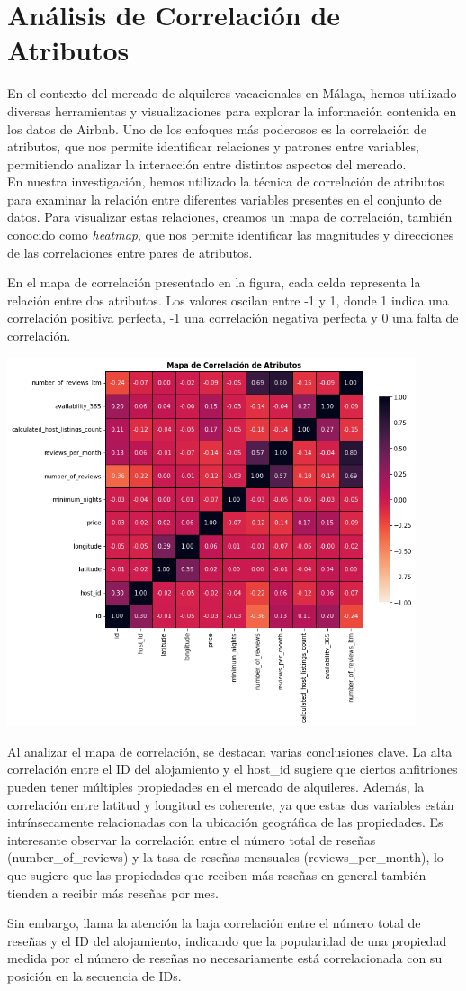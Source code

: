 \section{Análisis de Correlación de Atributos}
En el contexto del mercado de alquileres vacacionales en Málaga, hemos utilizado diversas herramientas y visualizaciones para explorar la información contenida en los datos de Airbnb. Uno de los enfoques más poderosos es la correlación de atributos, que nos permite identificar relaciones y patrones entre variables, permitiendo analizar la interacción entre distintos aspectos del mercado.\\
En nuestra investigación, hemos utilizado la técnica de correlación de atributos para examinar la relación entre diferentes variables presentes en el conjunto de datos. Para visualizar estas relaciones, creamos un mapa de correlación, también conocido como \textit{heatmap}, que nos permite identificar las magnitudes y direcciones de las correlaciones entre pares de atributos.

En el mapa de correlación presentado en la figura, cada celda representa la relación entre dos atributos. Los valores oscilan entre -1 y 1, donde 1 indica una correlación positiva perfecta, -1 una correlación negativa perfecta y 0 una falta de correlación.
\begin{center}
    \centering
    \includegraphics[width=0.9\textwidth]{capturas/25.png}
\end{center}
Al analizar el mapa de correlación, se destacan varias conclusiones clave. La alta correlación entre el ID del alojamiento y el host\_id sugiere que ciertos anfitriones pueden tener múltiples propiedades en el mercado de alquileres. Además, la correlación entre latitud y longitud es coherente, ya que estas dos variables están intrínsecamente relacionadas con la ubicación geográfica de las propiedades.
Es interesante observar la correlación entre el número total de reseñas (number\_of\_reviews) y la tasa de reseñas mensuales (reviews\_per\_month), lo que sugiere que las propiedades que reciben más reseñas en general también tienden a recibir más reseñas por mes. 

Sin embargo, llama la atención la baja correlación entre el número total de reseñas y el ID del alojamiento, indicando que la popularidad de una propiedad medida por el número de reseñas no necesariamente está correlacionada con su posición en la secuencia de IDs.
\newpage